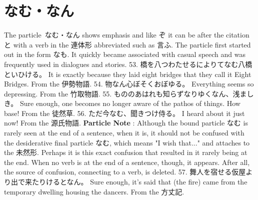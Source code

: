 \section{なむ・なん}
   The particle なむ・なん shows emphasis and like ぞ it can be after the citation と with a verb in the 連体形 abbreviated such as 言ふ. The particle first started out in the form なも. It quickly became associated with casual speech and was frequently used in dialogues and stories.  53. 橋を八つわたせるによりてなむ八橋といひける。 \hfill\break
It is exactly because they laid eight bridges that they call it Eight Bridges. \hfill\break
From the 伊勢物語.  54. 物なん心ぼそくおぼゆる。 \hfill\break
Everything seems so depressing. \hfill\break
From the 竹取物語.  55. もののあはれも知らずなりゆくなん、浅ましき。 \hfill\break
Sure enough, one becomes no longer aware of the pathos of things. How base! \hfill\break
From the 徒然草.  56. ただ今なむ、聞きつけ侍る。 \hfill\break
I heard about it just now! \hfill\break
From the 源氏物語. \hfill\break
\textbf{Particle Note }: Although the bound particle なむ is rarely seen at the end of a sentence, when it is, it should not be confused with the desiderative final particle なむ, which means "I wish that\dothyp{}\dothyp{}\dothyp{}" and attaches to the 未然形. Perhaps it is this exact confusion that resulted in it rarely being at the end. When no verb is at the end of a sentence, though, it appears. After all, the source of confusion, connecting to a verb, is deleted.  57. 舞人を宿せる仮屋より出で来たりけるとなん。 \hfill\break
Sure enough, it's said that (the fire) came from the temporary dwelling housing the dancers. \hfill\break
From the 方丈記.        
